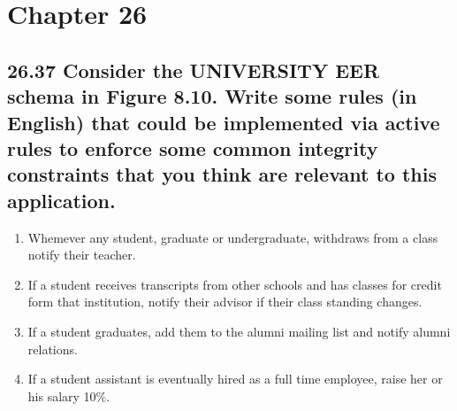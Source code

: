 \section*{Chapter 26}


\subsection*{26.37 Consider the UNIVERSITY EER schema in Figure 8.10. Write some rules (in English) that could be implemented via active rules to enforce some common integrity constraints that you think are relevant to this application.}

\begin{enumerate}
	\item Whemever any student, graduate or undergraduate, withdraws from a class notify their teacher.
	\item If a student receives transcripts from other schools and has classes for credit form that institution, notify their advisor if their class standing changes.
	\item If a student graduates, add them to the alumni mailing list and notify alumni relations.
	\item If a student assistant is eventually hired as a full time employee, raise her or his salary 10\%.
\end{enumerate}



